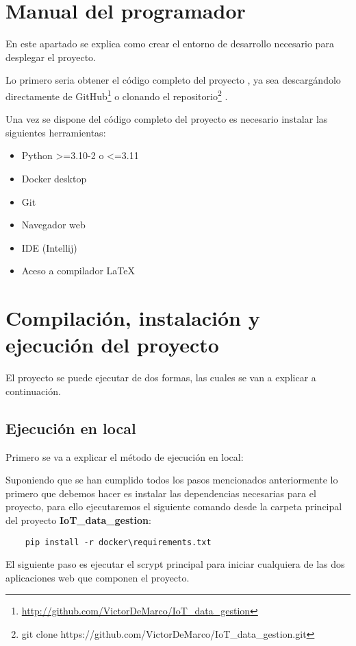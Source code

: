 \section{Manual del programador}
En este apartado se explica como crear el entorno de desarrollo necesario para desplegar el proyecto.

Lo primero seria obtener el código completo del proyecto , ya sea descargándolo directamente de GitHub\footnote{\href{http://github.com/VictorDeMarco/IoT_data_gestion}{http://github.com/VictorDeMarco/IoT\_data\_gestion}} o clonando el repositorio\footnote{git clone https://github.com/VictorDeMarco/IoT\_data\_gestion.git} .

Una vez se dispone del código completo del proyecto es necesario instalar las siguientes herramientas:

\begin{itemize}
    \item Python >=3.10-2 o <=3.11
    \item Docker desktop
    \item Git
    \item Navegador web 
    \item IDE (Intellij)
    \item Aceso a compilador LaTeX
\end{itemize}


\section{Compilación, instalación y ejecución del proyecto}
El proyecto se puede ejecutar de dos formas, las cuales se van a explicar a continuación.

\label{ejec_local}
\subsection{Ejecución en local}
Primero se va a explicar el método de ejecución en local:

Suponiendo que se han cumplido todos los pasos mencionados
anteriormente lo primero que debemos hacer es instalar las dependencias necesarias para el proyecto, para ello ejecutaremos el siguiente comando desde la carpeta principal del proyecto \textbf{IoT\_data\_gestion}:

\begin{verbatim}
    pip install -r docker\requirements.txt
\end{verbatim}

El siguiente paso es ejecutar el scrypt principal para iniciar cualquiera de las dos aplicaciones web que componen el proyecto. 


